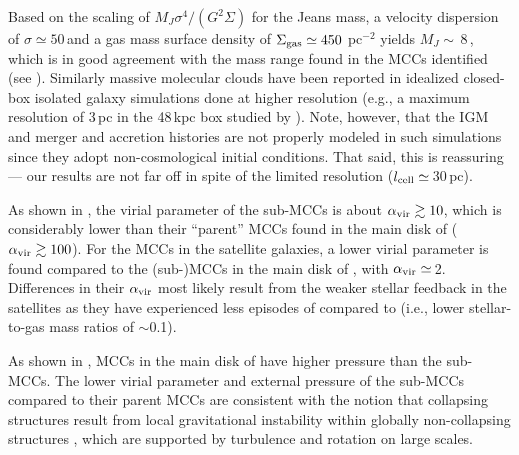 \IfFileExists{emulateapjlegacy.cls}{\documentclass[iop]{emulateapjlegacy}}{\documentclass[iop]{emulateapj}}
\begin{document}
Based on the scaling of $M_J$\eq$\sigma^4/(G^2\Sigma)$ for the Jeans mass, a
velocity dispersion of $\sigma\simeq50$\,\kms and a
gas mass surface density of $\Sigma_{\rm gas}\simeq450$\,\Msun\,pc$^{-2}$ yields
$M_J\sim$\,8\,\Msun, which is in good agreement with the mass range found in the MCCs identified (see ).
%
Similarly massive molecular clouds have been reported in idealized closed-box isolated galaxy simulations done at higher resolution (e.g., a maximum
resolution of 3\,pc in the 48\,kpc box studied by \citealt{Behrendt16a}).
Note, however, that the IGM and merger and accretion histories are not properly modeled in such simulations since they adopt non-cosmological initial conditions. That said, this is reassuring --- our results are not far off in spite of the limited resolution ($l_{\rm cell}\simeq$\,30\,pc).


As shown in ,
the virial parameter of the sub-MCCs is about $\alpha_{\rm vir}\gtrsim10$, which is considerably lower than their ``parent'' MCCs found in the main disk of \flower ($\alpha_{\rm vir}\gtrsim100$).
%
For the MCCs in the satellite galaxies, a lower virial parameter is found compared to the (sub-)MCCs in the main disk of \flower, with $\alpha_{\rm vir}\simeq$\,2.
Differences in their $\alpha_{\rm vir}$ most likely result from the weaker stellar feedback in the satellites as they have experienced less episodes of \SF compared to \flower (i.e., lower stellar-to-gas mass ratios of $\sim$0.1).

As shown in ,
MCCs in the main disk of \flower have higher pressure than the sub-MCCs. The lower virial parameter and external pressure of the sub-MCCs compared to their parent MCCs are consistent with the notion that collapsing structures result from local gravitational instability within globally non-collapsing structures \citep[see e.g.,][]{Ballesteros-Paredes11a}, which are supported by turbulence and rotation on large scales.
\end{document}

